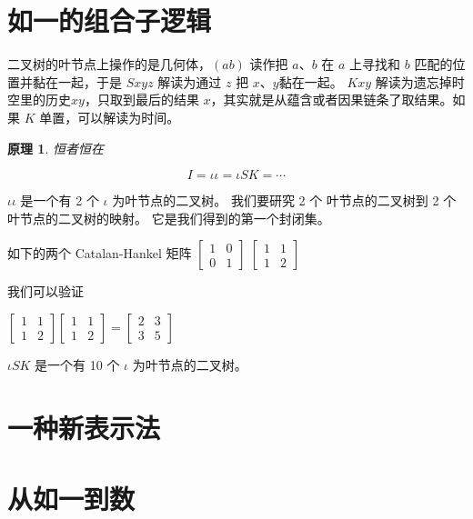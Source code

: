 \documentclass[a4paper,12pt]{article}
\numberwithin{definition}{section}
\numberwithin{lemma}{section}
\numberwithin{proposition}{section}
\numberwithin{theorem}{section}
\numberwithin{grammar}{section}
\numberwithin{program}{section}
\numberwithin{convention}{section}
\numberwithin{corollary}{section}
\newtheorem{principle}{原理}
\numberwithin{principle}{section}
\begin{document}
\section{如一的组合子逻辑}

二叉树的叶节点上操作的是几何体，$(a b)$ 读作把 $a$、$b$ 在 $a$ 上寻找和 $b$ 匹配的位置并黏在一起，于是 $Sxyz$ 解读为通过 $z$ 把 $x$、$y$黏在一起。
$Kxy$ 解读为遗忘掉时空里的历史$xy$，只取到最后的结果 $x$，其实就是从蕴含或者因果链条了取结果。如果 $K$ 单置，可以解读为时间。

\begin{principle}
恒者恒在
\end{principle}

$$I = \iota \iota = \iota S K = \cdots $$

$\iota \iota$ 是一个有 2 个 $\iota$ 为叶节点的二叉树。
我们要研究 2 个 叶节点的二叉树到 2 个 叶节点的二叉树的映射。
它是我们得到的第一个封闭集。

如下的两个 Catalan-Hankel 矩阵
$\begin{bmatrix}1 & 0 \\ 0 & 1\end{bmatrix}$
$\begin{bmatrix}1 & 1 \\ 1 & 2\end{bmatrix}$

我们可以验证

$\begin{bmatrix}1 & 1 \\ 1 & 2\end{bmatrix}\begin{bmatrix}1 & 1 \\ 1 & 2\end{bmatrix} = \begin{bmatrix}2 & 3 \\ 3 & 5\end{bmatrix}$


$\iota S K$ 是一个有 10 个 $\iota$ 为叶节点的二叉树。


\newpage

\section{一种新表示法}


\section{从如一到数}
\end{document}
